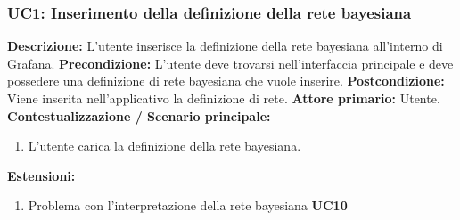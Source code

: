 		\subsubsection{UC1: Inserimento della definizione della rete bayesiana}
                	\textbf{Descrizione:} L'utente inserisce la definizione della rete bayesiana all'interno di Grafana.
                    \newline
                    \textbf{Precondizione:} L’utente deve trovarsi nell’interfaccia principale e deve possedere una definizione di rete bayesiana che vuole inserire.
                    \newline
                    \textbf{Postcondizione:} Viene inserita nell’applicativo la definizione di rete.
                    \newline
                    \textbf{Attore primario:} Utente.
                    \newline
                    \textbf{Contestualizzazione / Scenario principale:} 
		    \begin{enumerate}
		    	\item L’utente carica la definizione della rete bayesiana.
		    \end{enumerate}
                    \newline
                    \textbf{Estensioni:} 
		    \begin{enumerate}
                            \item Problema con l’interpretazione della rete bayesiana \textbf{UC10}
                    \end{enumerate}
                        
